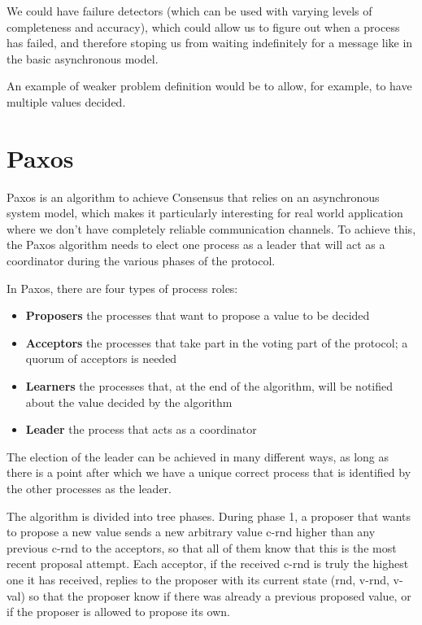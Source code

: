 We could have failure detectors (which can be used with varying levels of completeness and accuracy), which could allow us to figure out when a process has failed, and therefore stoping us from waiting indefinitely for a message like in the basic asynchronous model.

An example of weaker problem definition would be to allow, for example, to have multiple values decided.

\section{Paxos}\label{sec:Paxos}
Paxos is an algorithm to achieve Consensus that relies on an asynchronous system model, which makes it particularly interesting for real world application where we don't have completely reliable communication channels. To achieve this, the Paxos algorithm needs to elect one process as a leader that will act as a coordinator during the various phases of the protocol.

In Paxos, there are four types of process roles:
\begin{itemize}
  \item \textbf{Proposers} the processes that want to propose a value to be decided
  \item \textbf{Acceptors} the processes that take part in the voting part of the protocol; a quorum of acceptors is needed
  \item \textbf{Learners} the processes that, at the end of the algorithm, will be notified about the value decided by the algorithm
  \item \textbf{Leader} the process that acts as a coordinator
\end{itemize}

The election of the leader can be achieved in many different ways, as long as there is a point after which we have a unique correct process that is identified by the other processes as the leader.

The algorithm is divided into tree phases. During phase 1, a proposer that wants to propose a new value sends a new arbitrary value c-rnd higher than any previous c-rnd to the acceptors, so that all of them know that this is the most recent proposal attempt. Each acceptor, if the received c-rnd is truly the highest one it has received, replies to the proposer with its current state (rnd, v-rnd, v-val) so that the proposer know if there was already a previous proposed value, or if the proposer is allowed to propose its own.

